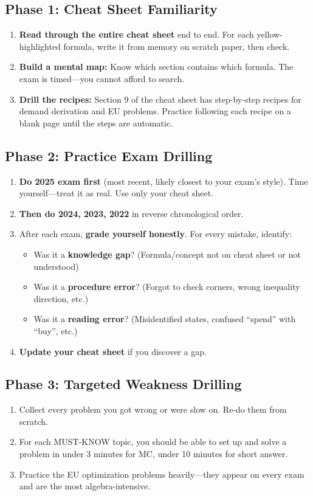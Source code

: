 \documentclass[10pt]{article}
\begin{document}
\subsection{Phase 1: Cheat Sheet Familiarity}
\begin{enumerate}[nosep,leftmargin=16pt]
\item \textbf{Read through the entire cheat sheet} end to end. For each yellow-highlighted formula, write it from memory on scratch paper, then check.
\item \textbf{Build a mental map:} Know which section contains which formula. The exam is timed---you cannot afford to search.
\item \textbf{Drill the recipes:} Section 9 of the cheat sheet has step-by-step recipes for demand derivation and EU problems. Practice following each recipe on a blank page until the steps are automatic.
\end{enumerate}

\subsection{Phase 2: Practice Exam Drilling}
\begin{enumerate}[nosep,leftmargin=16pt]
\item \textbf{Do 2025 exam first} (most recent, likely closest to your exam's style). Time yourself---treat it as real. Use only your cheat sheet.
\item \textbf{Then do 2024, 2023, 2022} in reverse chronological order.
\item After each exam, \textbf{grade yourself honestly}. For every mistake, identify:
  \begin{itemize}[nosep]
  \item Was it a \textbf{knowledge gap}? (Formula/concept not on cheat sheet or not understood)
  \item Was it a \textbf{procedure error}? (Forgot to check corners, wrong inequality direction, etc.)
  \item Was it a \textbf{reading error}? (Misidentified states, confused ``spend'' with ``buy'', etc.)
  \end{itemize}
\item \textbf{Update your cheat sheet} if you discover a gap.
\end{enumerate}

\subsection{Phase 3: Targeted Weakness Drilling}
\begin{enumerate}[nosep,leftmargin=16pt]
\item Collect every problem you got wrong or were slow on. Re-do them from scratch.
\item For each MUST-KNOW topic, you should be able to set up and solve a problem in under 3 minutes for MC, under 10 minutes for short answer.
\item Practice the EU optimization problems heavily---they appear on every exam and are the most algebra-intensive.
\end{enumerate}
\end{document}
